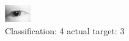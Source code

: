 \begin{figure}[h!]
\begin{center}
\includegraphics[width=0.60\columnwidth]{figures/ID110_class_4_target_3.png}
\end{center}
\caption{ Classification: 4 actual target: 3}
\label{fig:ID110_class_4_target_3}
\end{figure}
